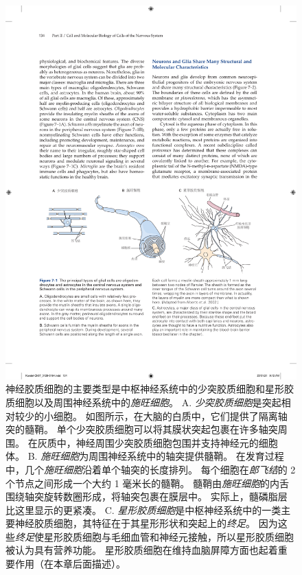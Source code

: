 \begin{figure}[htbp]
	\centering
	\includegraphics[width=1.0\linewidth]{chap07/fig_7_1}
	\caption{神经胶质细胞的主要类型是中枢神经系统中的少突胶质细胞和星形胶质细胞以及周围神经系统中的\textit{施旺细胞}。
		A. \textit{少突胶质细胞}是突起相对较少的小细胞。
		如图所示，在大脑的白质中，它们提供了隔离轴突的髓鞘。
		单个少突胶质细胞可以将其膜状突起包裹在许多轴突周围。
		在灰质中，神经周围少突胶质细胞包围并支持神经元的细胞体。
		B. \textit{施旺细胞}为周围神经系统中的轴突提供髓鞘。
		在发育过程中，几个\textit{施旺细胞}沿着单个轴突的长度排列。
		每个细胞在\textit{郎飞结}的 2 个节点之间形成一个大约 1 毫米长的髓鞘。
		髓鞘由\textit{施旺细胞}的内舌围绕轴突旋转数圈形成，将轴突包裹在膜层中。
		实际上，髓磷脂层比这里显示的更紧凑。
		C. \textit{星形胶质细胞}是中枢神经系统中的一类主要神经胶质细胞，其特征在于其星形形状和突起上的\textit{终足}。
		因为这些\textit{终足}使星形胶质细胞与毛细血管和神经元接触，所以星形胶质细胞被认为具有营养功能。
		星形胶质细胞在维持血脑屏障方面也起着重要作用（在本章后面描述）。}
	\label{fig:7_1}
\end{figure}


